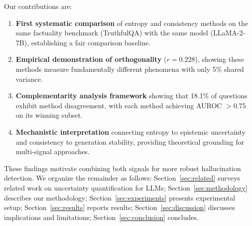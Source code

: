 Our contributions are:

\begin{enumerate}
    \item \textbf{First systematic comparison} of entropy and consistency methods on the same factuality benchmark (TruthfulQA) with the same model (LLaMA-2-7B), establishing a fair comparison baseline.

    \item \textbf{Empirical demonstration of orthogonality} ($r = 0.228$), showing these methods measure fundamentally different phenomena with only 5\% shared variance.

    \item \textbf{Complementarity analysis framework} showing that 18.1\% of questions exhibit method disagreement, with each method achieving AUROC $> 0.75$ on its winning subset.

    \item \textbf{Mechanistic interpretation} connecting entropy to epistemic uncertainty and consistency to generation stability, providing theoretical grounding for multi-signal approaches.
\end{enumerate}

These findings motivate combining both signals for more robust hallucination detection. We organize the remainder as follows: Section~\ref{sec:related} surveys related work on uncertainty quantification for LLMs; Section~\ref{sec:methodology} describes our methodology; Section~\ref{sec:experiments} presents experimental setup; Section~\ref{sec:results} reports results; Section~\ref{sec:discussion} discusses implications and limitations; Section~\ref{sec:conclusion} concludes.
